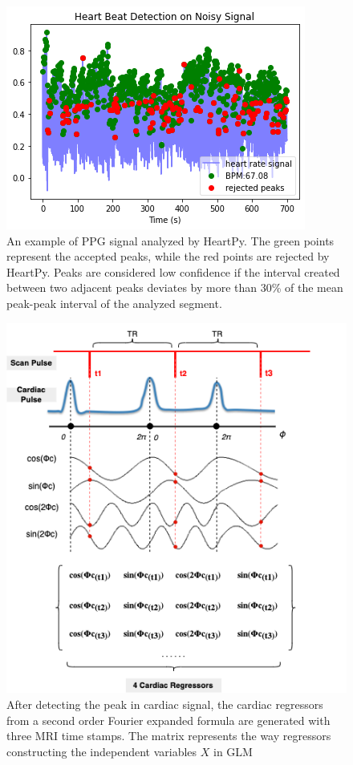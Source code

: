 \begin{figure}[htp]
    \centering
    \includegraphics[width=\columnwidth]{Figures/heartpy.png}
    \caption{An example of PPG signal analyzed by HeartPy. The green points represent the accepted peaks,
    while the red points are rejected by HeartPy. Peaks are considered low confidence if the interval created between two adjacent peaks deviates 
    by more than 30\% of the mean peak-peak interval of the analyzed segment. \cite{van2019heartpy}}
    \label{fig:heart}
\end{figure} 

\begin{figure}[htp]
    \centering
    \includegraphics[width=\columnwidth]{Figures/cardiac.png}
    \caption{After detecting the peak in cardiac signal, the cardiac regressors from a second order Fourier expanded formula are generated with three MRI time stamps. 
    The matrix represents the way regressors constructing the independent variables $X$ in GLM }
    \label{fig:cardiac}
\end{figure} 

